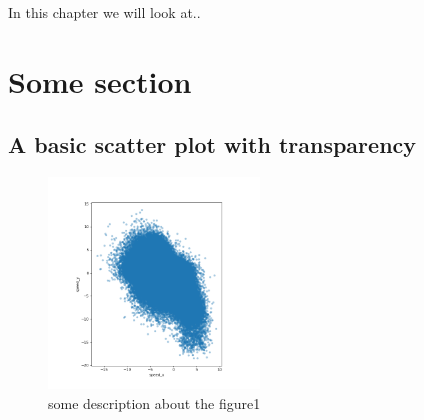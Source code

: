 In this chapter we will look at..

\section{Some section}

\subsection{A basic scatter plot with transparency}

\begin{figure}[h!]
    \centering
    \includegraphics[width=0.50\textwidth]{images/figure1.png}
    \caption{some description about the figure1}
    \label{fig: PaleBlueDot}    
\end{figure}
